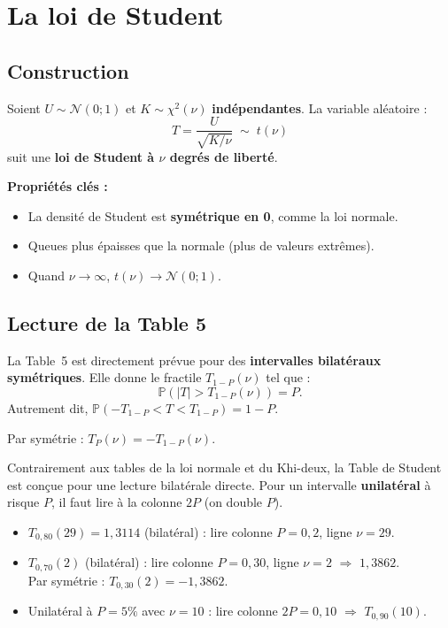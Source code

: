\documentclass[11pt,a4paper]{article}
\newcommand{\N}{\mathcal{N}}
\newcommand{\Prob}{\mathbb{P}}
\renewcommand{\P}{\Prob}
\begin{document}
\section{La loi de Student}

\subsection{Construction}

\begin{defbox}
Soient $U \sim \N(0;1)$ et $K \sim \chi^2(\nu)$ \textbf{ind\'ependantes}. La variable al\'eatoire :
$$T = \frac{U}{\sqrt{K/\nu}} \;\sim\; t(\nu)$$
suit une \textbf{loi de Student \`a $\nu$ degr\'es de libert\'e}.
\end{defbox}

\textbf{Propri\'et\'es cl\'es :}
\begin{itemize}
\item La densit\'e de Student est \textbf{sym\'etrique en 0}, comme la loi normale.
\item Queues plus \'epaisses que la normale (plus de valeurs extr\^emes).
\item Quand $\nu \to \infty$, $t(\nu) \to \N(0;1)$.
\end{itemize}

\subsection{Lecture de la Table 5}

\begin{defbox}
La Table~5 est directement pr\'evue pour des \textbf{intervalles bilat\'eraux sym\'etriques}. Elle donne le fractile $T_{1-P}(\nu)$ tel que :
$$\P\!\left(|T| > T_{1-P}(\nu)\right) = P.$$
Autrement dit, $\P\!\left(-T_{1-P} < T < T_{1-P}\right) = 1-P$.

Par sym\'etrie : $T_P(\nu) = -T_{1-P}(\nu)$.
\end{defbox}

\begin{alertbox}
Contrairement aux tables de la loi normale et du Khi-deux, la Table de Student est con\c{c}ue pour une lecture bilat\'erale directe. Pour un intervalle \textbf{unilat\'eral} \`a risque $P$, il faut lire \`a la colonne $2P$ (on double $P$).
\end{alertbox}

\begin{exbox}
\begin{itemize}
\item $T_{0{,}80}(29) = 1{,}3114$ (bilat\'eral) : lire colonne $P=0{,}2$, ligne $\nu=29$.
\item $T_{0{,}70}(2)$ (bilat\'eral) : lire colonne $P = 0{,}30$, ligne $\nu=2$ $\Rightarrow$ $1{,}3862$.\\
Par sym\'etrie : $T_{0{,}30}(2) = -1{,}3862$.
\item Unilat\'eral \`a $P=5\%$ avec $\nu=10$ : lire colonne $2P = 0{,}10$ $\Rightarrow$ $T_{0{,}90}(10)$.
\end{itemize}
\end{exbox}
\end{document}
